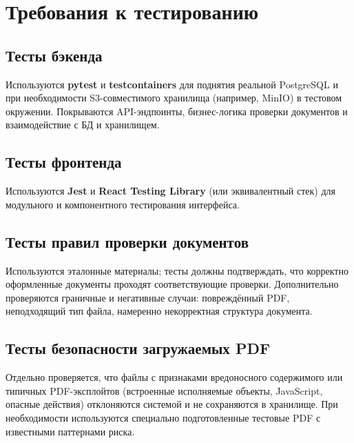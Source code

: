 \section{Требования к тестированию}

\subsection{Тесты бэкенда}

Используются \textbf{pytest} и \textbf{testcontainers} для поднятия реальной PostgreSQL и при необходимости S3-совместимого хранилища (например, MinIO) в тестовом окружении. Покрываются API-эндпоинты, бизнес-логика проверки документов и взаимодействие с БД и хранилищем.

\subsection{Тесты фронтенда}

Используются \textbf{Jest} и \textbf{React Testing Library} (или эквивалентный стек) для модульного и компонентного тестирования интерфейса.

\subsection{Тесты правил проверки документов}

Используются эталонные материалы; тесты должны подтверждать, что корректно оформленные документы проходят соответствующие проверки. Дополнительно проверяются граничные и негативные случаи: повреждённый PDF, неподходящий тип файла, намеренно некорректная структура документа.

\subsection{Тесты безопасности загружаемых PDF}

Отдельно проверяется, что файлы с признаками вредоносного содержимого или типичных PDF-эксплойтов (встроенные исполняемые объекты, JavaScript, опасные действия) отклоняются системой и не сохраняются в хранилище. При необходимости используются специально подготовленные тестовые PDF с известными паттернами риска.
